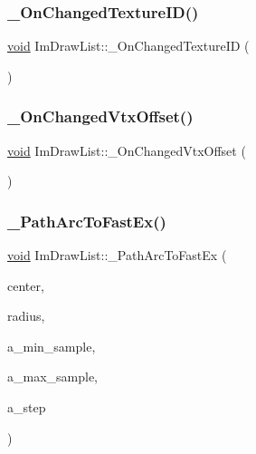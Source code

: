 \subsubsection{\texorpdfstring{\+\_\+\+On\+Changed\+Texture\+I\+D()}{\_OnChangedTextureID()}}
{\footnotesize\ttfamily \hyperlink{imgui__impl__opengl3__loader_8h_ac668e7cffd9e2e9cfee428b9b2f34fa7}{void} Im\+Draw\+List\+::\+\_\+\+On\+Changed\+Texture\+ID (\begin{DoxyParamCaption}{ }\end{DoxyParamCaption})}

\mbox{\label{structImDrawList_a7f2e315f147acd8b555d86d1557659cc}} 
\subsubsection{\texorpdfstring{\+\_\+\+On\+Changed\+Vtx\+Offset()}{\_OnChangedVtxOffset()}}
{\footnotesize\ttfamily \hyperlink{imgui__impl__opengl3__loader_8h_ac668e7cffd9e2e9cfee428b9b2f34fa7}{void} Im\+Draw\+List\+::\+\_\+\+On\+Changed\+Vtx\+Offset (\begin{DoxyParamCaption}{ }\end{DoxyParamCaption})}

\mbox{\label{structImDrawList_ac25f3a7693ed13ba2dac455675be8654}} 
\subsubsection{\texorpdfstring{\+\_\+\+Path\+Arc\+To\+Fast\+Ex()}{\_PathArcToFastEx()}}
{\footnotesize\ttfamily \hyperlink{imgui__impl__opengl3__loader_8h_ac668e7cffd9e2e9cfee428b9b2f34fa7}{void} Im\+Draw\+List\+::\+\_\+\+Path\+Arc\+To\+Fast\+Ex (\begin{DoxyParamCaption}\item[{const \hyperlink{structImVec2}{Im\+Vec2} \&}]{center,  }\item[{float}]{radius,  }\item[{int}]{a\+\_\+min\+\_\+sample,  }\item[{int}]{a\+\_\+max\+\_\+sample,  }\item[{int}]{a\+\_\+step }\end{DoxyParamCaption})}

